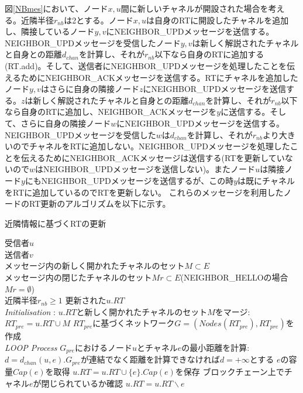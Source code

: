 \documentclass[12pt]{jarticle}
\begin{document}
図\ref{NBmes}において、ノード$x,u$間に新しいチャネルが開設された場合を考える。近隣半径$r_{nb}$は2とする。ノード$x,u$は自身のRTに開設したチャネルを追加し、隣接しているノード$y,v$にNEIGHBOR\_UPDメッセージを送信する。NEIGHBOR\_UPDメッセージを受信したノード$y,v$は新しく解説されたチャネルと自身との距離$d_{chan}$を計算し、それが$r_{nb}$以下なら自身のRTに追加する(RT.add)。そして、送信者にNEIGHBOR\_UPDメッセージを処理したことを伝えるためにNEIGHBOR\_ACKメッセージを送信する。RTにチャネルを追加したノード$y,v$はさらに自身の隣接ノード$z$にNEIGHBOR\_UPDメッセージを送信する。$z$は新しく解説されたチャネルと自身との距離$d_{chan}$を計算し、それが$r_{nb}$以下なら自身のRTに追加し、NEIGHBOR\_ACKメッセージを$y$に送信する。そして、さらに自身の隣接ノード$w$にNEIGHBOR\_UPDメッセージを送信する。NEIGHBOR\_UPDメッセージを受信した$w$は$d_{chan}$を計算し、それが$r_{nb}$より大きいのでチャネルをRTに追加しない。NEIGHBOR\_UPDメッセージを処理したことを伝えるためにNEIGHBOR\_ACKメッセージは送信する(RTを更新していないので$w$はNEIGHBOR\_UPDメッセージを送信しない)。またノード$u$は隣接ノード$y$にもNEIGHBOR\_UPDメッセージを送信するが、この時$y$は既にチャネルをRTに追加しているのでRTを更新しない。
これらのメッセージを利用したノードのRT更新のアルゴリズムを以下に示す。

\begin{algorithm}
 \caption{近隣情報に基づくRTの更新}
 \begin{algorithmic}[1]
 \renewcommand{\algorithmicrequire}{\textbf{Input:}}
 \renewcommand{\algorithmicensure}{\textbf{Output:}}
 \REQUIRE 受信者$u$ \\
 送信者$v$ \\
 メッセージ内の新しく開かれたチャネルのセット$M \subset E$ \\
 メッセージ内の閉じたチャネルのセット$Mr \subset E$(NEIGHBOR\_HELLOの場合$Mr = \emptyset$) \\
 近隣半径$r_{nb} \geq 1$
 \ENSURE  更新された$u.RT$
 \\ \textit{Initialisation} :
  \STATE $u.RT$と新しく開かれたチャネルのセット$M$をマージ:$RT_{pre} = u.RT \cup M$
  \STATE $RT_{pre}$に基づくネットワーク$G = (Nodes(RT_{pre}), RT_{pre})$を作成
 \\ \textit{LOOP Process}
  \STATE $G_{pre}$におけるノード$u$とチャネル$e$の最小距離を計算:$d = d_{chan}(u,e)$.$G_{pre}$が連結でなく距離を計算できなければ$d = +\infty$とする
  \STATE $e$の容量$Cap(e)$を取得
  \STATE $u.RT = u.RT \cup \{e\}$.$Cap(e)$を保存
  \ENDIF
  \ENDFOR
  \STATE ブロックチェーン上でチャネル$e$が閉じられているか確認
  \STATE $u.RT = u.RT \backslash {e}$ 
  \ENDIF
  \ENDFOR
 \end{algorithmic} 
 \end{algorithm}
\end{document}
